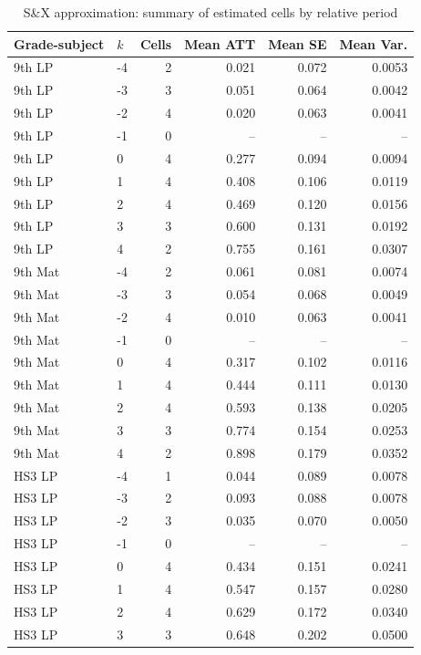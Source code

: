 ﻿\begin{table}[!htbp]
\centering
\caption{S\&X approximation: summary of estimated cells by relative period}
\label{tab:ap_sx_resumo_periodo}
\vspace{-0.15cm}
\scriptsize
\setlength{\tabcolsep}{4pt}
\renewcommand{\arraystretch}{0.92}
\begin{tabular}{llrrrr}
\toprule
Grade-subject & \(k\) & Cells & Mean ATT & Mean SE & Mean Var. \\
\midrule
9th LP & -4 & 2 & 0.021 & 0.072 & 0.0053 \\
9th LP & -3 & 3 & 0.051 & 0.064 & 0.0042 \\
9th LP & -2 & 4 & 0.020 & 0.063 & 0.0041 \\
9th LP & -1 & 0 & -- & -- & -- \\
9th LP & 0 & 4 & 0.277 & 0.094 & 0.0094 \\
9th LP & 1 & 4 & 0.408 & 0.106 & 0.0119 \\
9th LP & 2 & 4 & 0.469 & 0.120 & 0.0156 \\
9th LP & 3 & 3 & 0.600 & 0.131 & 0.0192 \\
9th LP & 4 & 2 & 0.755 & 0.161 & 0.0307 \\
9th Mat & -4 & 2 & 0.061 & 0.081 & 0.0074 \\
9th Mat & -3 & 3 & 0.054 & 0.068 & 0.0049 \\
9th Mat & -2 & 4 & 0.010 & 0.063 & 0.0041 \\
9th Mat & -1 & 0 & -- & -- & -- \\
9th Mat & 0 & 4 & 0.317 & 0.102 & 0.0116 \\
9th Mat & 1 & 4 & 0.444 & 0.111 & 0.0130 \\
9th Mat & 2 & 4 & 0.593 & 0.138 & 0.0205 \\
9th Mat & 3 & 3 & 0.774 & 0.154 & 0.0253 \\
9th Mat & 4 & 2 & 0.898 & 0.179 & 0.0352 \\
HS3 LP & -4 & 1 & 0.044 & 0.089 & 0.0078 \\
HS3 LP & -3 & 2 & 0.093 & 0.088 & 0.0078 \\
HS3 LP & -2 & 3 & 0.035 & 0.070 & 0.0050 \\
HS3 LP & -1 & 0 & -- & -- & -- \\
HS3 LP & 0 & 4 & 0.434 & 0.151 & 0.0241 \\
HS3 LP & 1 & 4 & 0.547 & 0.157 & 0.0280 \\
HS3 LP & 2 & 4 & 0.629 & 0.172 & 0.0340 \\
HS3 LP & 3 & 3 & 0.648 & 0.202 & 0.0500 \\

\end{tabular}
\end{table}
